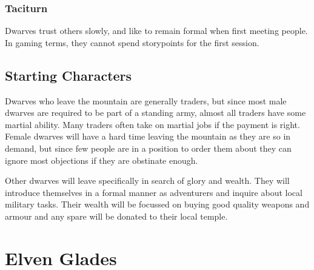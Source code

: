 \begin{multicols}{2}
\subsubsection{Taciturn}

Dwarves trust others slowly, and like to remain formal when first meeting people.
In gaming terms, they cannot spend \glspl{storypoint} for the first session.

\subsection{Starting Characters}

Dwarves who leave the mountain are generally traders, but since most male dwarves are required to be part of a standing army, almost all traders have some martial ability.
Many traders often take on martial jobs if the payment is right.
Female dwarves will have a hard time leaving the mountain as they are so in demand, but since few people are in a position to order them about they can ignore most objections if they are obstinate enough.

Other dwarves will leave specifically in search of glory and wealth.
They will introduce themselves in a formal manner as adventurers and inquire about local military tasks.
Their wealth will be focussed on buying good quality weapons and armour and any spare will be donated to their local temple.

\end{multicols}

\section[Elves]{Elven Glades \El}


